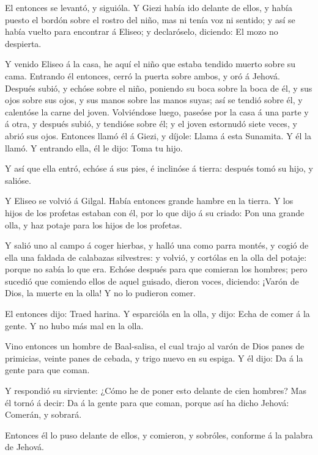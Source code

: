  El entonces se levantó, y siguióla. Y Giezi había ido
delante de ellos, y había puesto el bordón sobre el rostro del niño, mas
ni tenía voz ni sentido; y así se había vuelto para encontrar á Eliseo;
y declaróselo, diciendo: El mozo no despierta.

 Y venido Eliseo á la casa, he aquí el niño que estaba
tendido muerto sobre su cama.  Entrando él entonces, cerró
la puerta sobre ambos, y oró á Jehová.  Después subió, y
echóse sobre el niño, poniendo su boca sobre la boca de él, y sus ojos
sobre sus ojos, y sus manos sobre las manos suyas; así se tendió sobre
él, y calentóse la carne del joven.  Volviéndose luego,
paseóse por la casa á una parte y á otra, y después subió, y tendióse
sobre él; y el joven estornudó siete veces, y abrió sus ojos.
 Entonces llamó él á Giezi, y díjole: Llama á esta
Sunamita. Y él la llamó. Y entrando ella, él le dijo: Toma tu hijo.

 Y así que ella entró, echóse á sus pies, é inclinóse á
tierra: después tomó su hijo, y salióse.

 Y Eliseo se volvió á Gilgal. Había entonces grande hambre
en la tierra. Y los hijos de los profetas estaban con él, por lo que
dijo á su criado: Pon una grande olla, y haz potaje para los hijos de
los profetas.

 Y salió uno al campo á coger hierbas, y halló una como
parra montés, y cogió de ella una faldada de calabazas silvestres: y
volvió, y cortólas en la olla del potaje: porque no sabía lo que era.
 Echóse después para que comieran los hombres; pero sucedió
que comiendo ellos de aquel guisado, dieron voces, diciendo: ¡Varón de
Dios, la muerte en la olla! Y no lo pudieron comer.

 El entonces dijo: Traed harina. Y esparcióla en la olla, y
dijo: Echa de comer á la gente. Y no hubo más mal en la olla.

 Vino entonces un hombre de Baal-salisa, el cual trajo al
varón de Dios panes de primicias, veinte panes de cebada, y trigo nuevo
en su espiga. Y él dijo: Da á la gente para que coman.

 Y respondió su sirviente: ¿Cómo he de poner esto delante
de cien hombres? Mas él tornó á decir: Da á la gente para que coman,
porque así ha dicho Jehová: Comerán, y sobrará.

 Entonces él lo puso delante de ellos, y comieron, y
sobróles, conforme á la palabra de Jehová.

